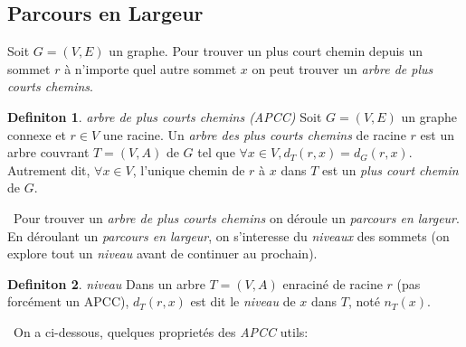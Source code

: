 \documentclass[french]{article}
\theoremstyle{definition}
\newtheorem{definition}{Definiton}[subsection]
\begin{document}
		\subsection{Parcours en Largeur}
		Soit $G = (V, E)$ un graphe. Pour trouver un plus court chemin depuis un sommet $r$ à n'importe quel autre sommet $x$ on peut trouver un \textit{arbre de plus courts chemins}.
		\\
		\begin{definition}{\textit{arbre de plus courts chemins (APCC)}}
			Soit $G = (V, E)$ un graphe connexe et $r \in V$ une racine. Un \textit{arbre des plus courts chemins} de racine $r$ est un arbre couvrant $T = (V, A)$ de $G$ tel que $\forall x \in V, d_T(r, x) = d_G(r, x)$. Autrement dit, $\forall x \in V$, l'unique chemin de $r$ à $x$ dans $T$ est un \textit{plus court chemin} de $G$.
		\end{definition}
		\
		Pour trouver un \textit{arbre de plus courts chemins} on déroule un \textit{parcours en largeur}. En déroulant un \textit{parcours en largeur}, on s'interesse du \textit{niveaux} des sommets (on explore tout un \textit{niveau} avant de continuer au prochain).\\
		\begin{definition}{\textit{niveau}}
			Dans un arbre $T = (V, A)$ enraciné de racine $r$ (pas forcément un APCC), $d_T(r, x)$ est dit le \textit{niveau} de $x$ dans $T$, noté $n_T(x)$.
		\end{definition}
		\
		On a ci-dessous, quelques proprietés des \textit{APCC} utils:
		\\
\end{document}
